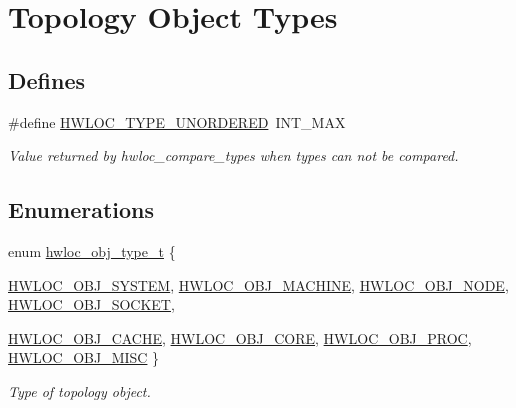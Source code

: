 \hypertarget{group__hwlocality__types}{
\section{Topology Object Types}
\label{group__hwlocality__types}
}
\subsection*{Defines}
\begin{CompactItemize}
\item 
\#define \hyperlink{group__hwlocality__types_g3b6e4128e9fe773863b123fa6e4a080b}{HWLOC\_\-TYPE\_\-UNORDERED}~INT\_\-MAX
\begin{CompactList}\small\item\em Value returned by hwloc\_\-compare\_\-types when types can not be compared. \item\end{CompactList}\end{CompactItemize}
\subsection*{Enumerations}
\begin{CompactItemize}
\item 
enum \hyperlink{group__hwlocality__types_gcd37bb612667dc437d66bfb175a8dc55}{hwloc\_\-obj\_\-type\_\-t} \{ \par
\hyperlink{group__hwlocality__types_ggcd37bb612667dc437d66bfb175a8dc553aa1b842d1fd4207ebce171f95a244ec}{HWLOC\_\-OBJ\_\-SYSTEM}, 
\hyperlink{group__hwlocality__types_ggcd37bb612667dc437d66bfb175a8dc553f4e83ffc4a259354959ae8a9eaa2a80}{HWLOC\_\-OBJ\_\-MACHINE}, 
\hyperlink{group__hwlocality__types_ggcd37bb612667dc437d66bfb175a8dc55af0964881117bdedf1a5e9332cd120dd}{HWLOC\_\-OBJ\_\-NODE}, 
\hyperlink{group__hwlocality__types_ggcd37bb612667dc437d66bfb175a8dc551ac6e07775ae4324b3fe9dbd72c785ec}{HWLOC\_\-OBJ\_\-SOCKET}, 
\par
\hyperlink{group__hwlocality__types_ggcd37bb612667dc437d66bfb175a8dc5556ee0b7eca88f363b75b34fdde8c9ddc}{HWLOC\_\-OBJ\_\-CACHE}, 
\hyperlink{group__hwlocality__types_ggcd37bb612667dc437d66bfb175a8dc55c793958f330bca371aa1535de8aff45f}{HWLOC\_\-OBJ\_\-CORE}, 
\hyperlink{group__hwlocality__types_ggcd37bb612667dc437d66bfb175a8dc555e0ccbbd5922cbb07b53fe892b91b8f2}{HWLOC\_\-OBJ\_\-PROC}, 
\hyperlink{group__hwlocality__types_ggcd37bb612667dc437d66bfb175a8dc5519f8a6953fa91efc76bcbcdf2d22de4d}{HWLOC\_\-OBJ\_\-MISC}
 \}
\begin{CompactList}\small\item\em Type of topology object. \item\end{CompactList}\end{CompactItemize}

